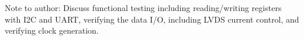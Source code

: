 \label{sec:3}

Note to author: Discuss functional testing including reading/writing registers with I2C and
UART, verifying the data I/O, including LVDS current control, and
verifying clock generation.


